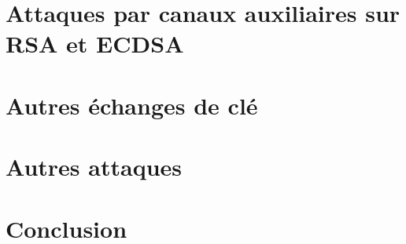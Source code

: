 \documentclass{mpg-ep-slides}
\begin{document}
\section[Timing]{Attaques par canaux auxiliaires sur RSA et ECDSA}
\tocsect


\section[Échanges]{Autres échanges de clé}
\tocsect


\section[Attaques]{Autres attaques}
\tocsect


\section{Conclusion}
\tocsect

\end{document}
